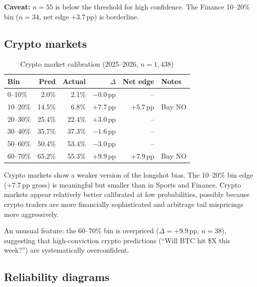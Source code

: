 \documentclass[11pt,a4paper]{article}
\begin{document}
\textbf{Caveat:} $n=55$ is below the threshold for high confidence.
The Finance 10--20\% bin ($n=34$, net edge $+3.7\,\mathrm{pp}$) is borderline.

\subsection{Crypto markets}

\begin{table}[H]
\centering
\caption{Crypto market calibration (2025--2026, $n=1{,}438$)}
\label{tab:crypto}
\small
\begin{tabular}{lrrrrl}
\toprule
Bin & Pred & Actual & $\Delta$ & Net edge & Notes \\
\midrule
0--10\%  & 2.0\% &  2.1\% & $-0.0\,\mathrm{pp}$ & -- & \\
10--20\% & 14.5\% &  6.8\% & $+7.7\,\mathrm{pp}$ & $+5.7\,\mathrm{pp}$ & Buy NO \\
20--30\% & 25.4\% & 22.4\% & $+3.0\,\mathrm{pp}$ & -- & \\
30--40\% & 35.7\% & 37.3\% & $-1.6\,\mathrm{pp}$ & -- & \\
50--60\% & 50.4\% & 53.4\% & $-3.0\,\mathrm{pp}$ & -- & \\
60--70\% & 65.2\% & 55.3\% & $+9.9\,\mathrm{pp}$ & $+7.9\,\mathrm{pp}$ & Buy NO \\
\bottomrule
\end{tabular}
\end{table}

Crypto markets show a weaker version of the longshot bias.
The 10--20\% bin edge ($+7.7\,\mathrm{pp}$ gross) is meaningful but smaller
than in Sports and Finance.
Crypto markets appear relatively better calibrated at low probabilities,
possibly because crypto traders are more financially sophisticated and arbitrage
tail mispricings more aggressively.

An unusual feature: the 60--70\% bin is overpriced ($\Delta = +9.9\,\mathrm{pp}$,
$n=38$), suggesting that high-conviction crypto predictions (``Will BTC hit
\$X this week?'') are systematically overconfident.

\subsection{Reliability diagrams}
\end{document}
